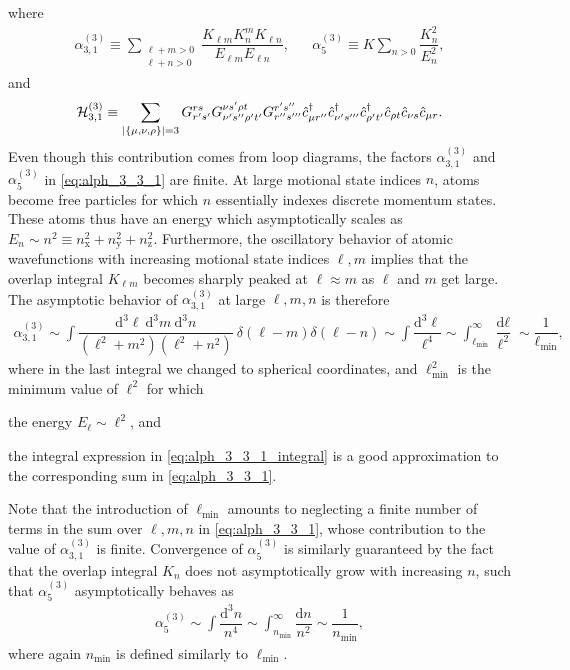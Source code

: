 \documentclass[preprint,showkeys,nofootinbib]{revtex4-1}
\renewcommand{\t}{\text} %
\newcommand{\f}{\dfrac} %
\newcommand{\p}[1]{\left(#1\right)} %
\renewcommand{\set}[1]{\left\{#1\right\}} %
\renewcommand{\d}{\text{d}}
\newcommand{\x}{\text{x}}
\newcommand{\y}{\text{y}}
\newcommand{\z}{\text{z}}
\renewcommand{\c}{\hat{c}}
\renewcommand{\H}{\mathcal{H}}
\newcommand{\1}{\mathds{1}}
\begin{document}
where
\begin{align}
  \alpha_{3,1}^{(3)} \equiv \sum_{\substack{\ell+m>0\\\ell+n>0}}
  \f{K_{\ell m} K^m_n K_{\ell n}}{E_{\ell m} E_{\ell n}},
  &&
  \alpha_5^{(3)}
  \equiv  K \sum_{n>0} \f{K_n^2}{E_n^2},
  \label{eq:alph_3_3_1}
\end{align}
and
\begin{align}
  \H_{3,1}^{(3)} \equiv \sum_{\abs{\set{\mu,\nu,\rho}}=3}
  G^{rs}_{r's'} G^{\nu s'\rho t}_{\nu's''\rho't'} G^{r's''}_{r''s'''}
  \c_{\mu r''}^\dag \c_{\nu's'''}^\dag \c_{\rho't'}^\dag
  \c_{\rho t} \c_{\nu s} \c_{\mu r}.
\end{align}
Even though this contribution comes from loop diagrams, the factors
$\alpha_{3,1}^{(3)}$ and $\alpha_5^{(3)}$ in \eqref{eq:alph_3_3_1} are
finite.  At large motional state indices $n$, atoms become free
particles for which $n$ essentially indexes discrete momentum states.
These atoms thus have an energy which asymptotically scales as
$E_n\sim n^2\equiv n_\x^2+n_\y^2+n_\z^2$.  Furthermore, the
oscillatory behavior of atomic wavefunctions with increasing motional
state indices $\ell,m$ implies that the overlap integral $K_{\ell m}$
becomes sharply peaked at $\ell\approx m$ as $\ell$ and $m$ get large.
The asymptotic behavior of $\alpha_{3,1}^{(3)}$ at large $\ell,m,n$ is
therefore
\begin{align}
  \alpha_{3,1}^{(3)}
  \sim \int \f{\d^3\ell~\d^3m~\d^3n}{\p{\ell^2+m^2}\p{\ell^2+n^2}}
  ~\delta\p{\ell-m}\delta\p{\ell-n}
  \sim \int \f{\d^3\ell}{\ell^4}
  \sim \int_{\ell_{\t{min}}}^\infty \f{\d\ell}{\ell^2}
  \sim \f1{\ell_{\t{min}}},
  \label{eq:alph_3_3_1_integral}
\end{align}
where in the last integral we changed to spherical coordinates, and
$\ell_{\t{min}}^2$ is the minimum value of $\ell^2$ for which
\begin{enumerate*}
\item the energy $E_\ell\sim\ell^2$, and
\item the integral expression in \eqref{eq:alph_3_3_1_integral} is a
  good approximation to the corresponding sum in
  \eqref{eq:alph_3_3_1}.
\end{enumerate*}
Note that the introduction of $\ell_{\t{min}}$ amounts to neglecting a
finite number of terms in the sum over $\ell,m,n$ in
\eqref{eq:alph_3_3_1}, whose contribution to the value of
$\alpha_{3,1}^{(3)}$ is finite.  Convergence of $\alpha_5^{(3)}$ is
similarly guaranteed by the fact that the overlap integral $K_n$ does
not asymptotically grow with increasing $n$, such that
$\alpha_5^{(3)}$ asymptotically behaves as
\begin{align}
  \alpha_5^{(3)} \sim \int \f{\d^3 n}{n^4}
  \sim \int_{n_{\t{min}}}^\infty \f{\d n}{n^2}
  \sim \f1{n_{\t{min}}},
  \label{eq:alph_5_3_integral}
\end{align}
where again $n_{\t{min}}$ is defined similarly to $\ell_{\t{min}}$.
\end{document}
